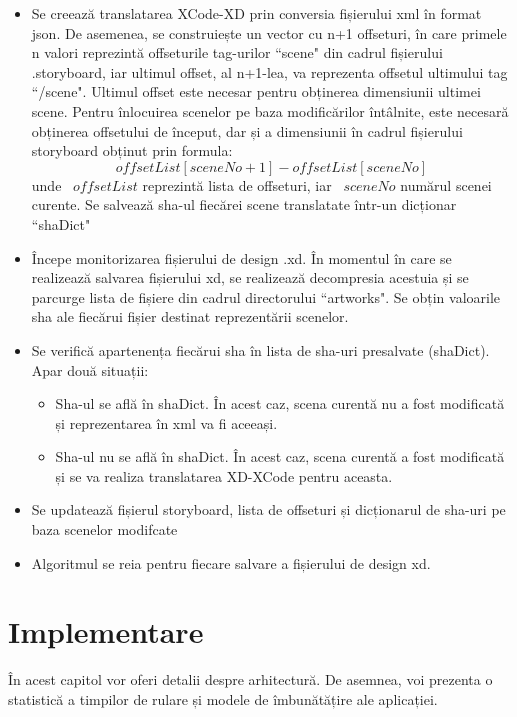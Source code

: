 \begin{itemize}  
\item Se creează translatarea XCode-XD prin conversia fișierului xml în format json. De asemenea, se construiește un vector cu n+1 offseturi, în care primele n valori reprezintă offseturile tag-urilor ``scene" din cadrul fișierului .storyboard, iar ultimul offset, al n+1-lea, va reprezenta offsetul ultimului tag ``/scene". Ultimul offset este necesar pentru obținerea dimensiunii ultimei scene. Pentru înlocuirea scenelor pe baza modificărilor întâlnite, este necesară obținerea offsetului de început, dar și a dimensiunii în cadrul fișierului storyboard obținut prin formula: 
\[offsetList[sceneNo + 1] - offsetList[sceneNo]\]
unde ~$offsetList$ reprezintă lista de offseturi, iar ~$sceneNo$ numărul scenei curente. Se salvează sha-ul fiecărei scene translatate într-un dicționar ``shaDict"

\item Începe monitorizarea fișierului de design .xd. În momentul în care se realizează salvarea fișierului xd, se realizează decompresia acestuia și se parcurge lista de fișiere din cadrul directorului ``artworks". Se obțin valoarile sha ale fiecărui fișier destinat reprezentării scenelor. 
\item Se verifică apartenența fiecărui sha în lista de sha-uri presalvate (shaDict). Apar două situații:
    \begin{itemize}  
    \item Sha-ul se află în shaDict. În acest caz, scena curentă nu a fost modificată și reprezentarea în xml va fi aceeași.
    \item Sha-ul nu se află în shaDict. În acest caz, scena curentă a fost modificată și se va realiza translatarea XD-XCode pentru aceasta.
    \end{itemize}
\item Se updatează fișierul storyboard, lista de offseturi și dicționarul de sha-uri pe baza scenelor modifcate
\item Algoritmul se reia pentru fiecare salvare a fișierului de design xd.
\end{itemize}



\chapter{Implementare}

În acest capitol vor oferi detalii despre arhitectură. De asemnea, voi prezenta o statistică a timpilor de rulare și modele de îmbunătățire ale aplicației.

